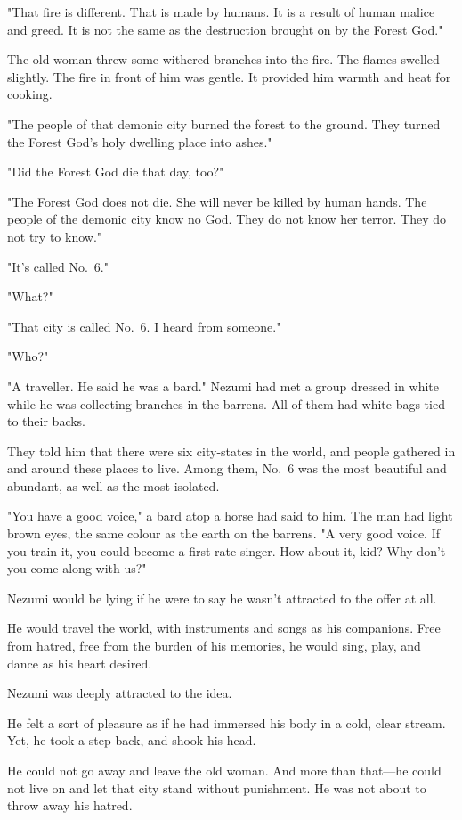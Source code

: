 "That fire is different. That is made by humans. It is a result of human
malice and greed. It is not the same as the destruction brought on by
the Forest God."

The old woman threw some withered branches into the fire. The flames
swelled slightly. The fire in front of him was gentle. It provided him
warmth and heat for cooking.

"The people of that demonic city burned the forest to the ground. They
turned the Forest God's holy dwelling place into ashes."

"Did the Forest God die that day, too?"

"The Forest God does not die. She will never be killed by human hands.
The people of the demonic city know no God. They do not know her terror.
They do not try to know."

"It's called No.~6."

"What?"

"That city is called No.~6. I heard from someone."

"Who?"

"A traveller. He said he was a bard." Nezumi had met a group dressed in
white while he was collecting branches in the barrens. All of them had
white bags tied to their backs.

They told him that there were six city-states in the world, and people
gathered in and around these places to live. Among them, No.~6 was the
most beautiful and abundant, as well as the most isolated.

"You have a good voice," a bard atop a horse had said to him. The man
had light brown eyes, the same colour as the earth on the barrens. "A
very good voice. If you train it, you could become a first-rate singer.
How about it, kid? Why don't you come along with us?"

Nezumi would be lying if he were to say he wasn't attracted to
the offer at all.

He would travel the world, with instruments and songs as his companions.
Free from hatred, free from the burden of his memories, he would sing,
play, and dance as his heart desired.

Nezumi was deeply attracted to the idea.

He felt a sort of pleasure as if he had immersed his body in a cold,
clear stream. Yet, he took a step back, and shook his head.

He could not go away and leave the old woman. And more than that---he
could not live on and let that city stand without punishment. He was not
about to throw away his hatred.


